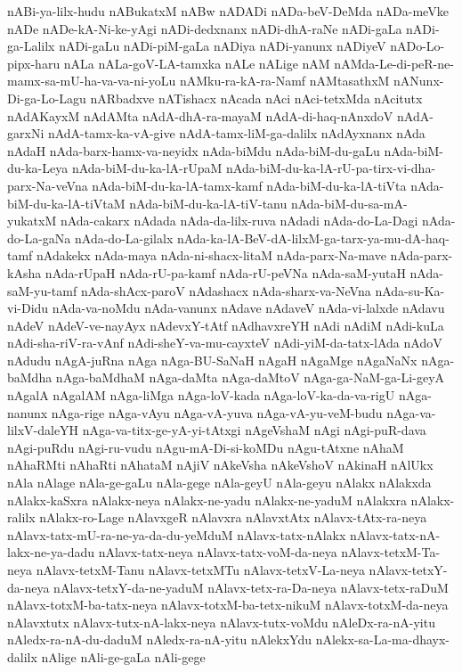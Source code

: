 {nABi-ya-lilx-hudu
nABukatxM
nABw
nADADi
nADa-beV-DeMda
nADa-meVke
nADe
nADe-kA-Ni-ke-yAgi
nADi-dedxnanx
nADi-dhA-raNe
nADi-gaLa
nADi-ga-Lalilx
nADi-gaLu
nADi-piM-gaLa
nADiya
nADi-yanunx
nADiyeV
nADo-Lo-pipx-haru
nALa
nALa-goV-LA-tamxka
nALe
nALige
nAM
nAMda-Le-di-peR-ne-mamx-sa-mU-ha-va-va-ni-yoLu
nAMku-ra-kA-ra-Namf
nAMtasathxM
nANunx-Di-ga-Lo-Lagu
nARbadxve
nATishacx
nAcada
nAci
nAci-tetxMda
nAcitutx
nAdAKayxM
nAdAMta
nAdA-dhA-ra-mayaM
nAdA-di-haq-nAnxdoV
nAdA-garxNi
nAdA-tamx-ka-vA-give
nAdA-tamx-liM-ga-dalilx
nAdAyxnanx
nAda
nAdaH
nAda-barx-hamx-va-neyidx
nAda-biMdu
nAda-biM-du-gaLu
nAda-biM-du-ka-Leya
nAda-biM-du-ka-lA-rUpaM
nAda-biM-du-ka-lA-rU-pa-tirx-vi-dha-parx-Na-veVna
nAda-biM-du-ka-lA-tamx-kamf
nAda-biM-du-ka-lA-tiVta
nAda-biM-du-ka-lA-tiVtaM
nAda-biM-du-ka-lA-tiV-tanu
nAda-biM-du-sa-mA-yukatxM
nAda-cakarx
nAdada
nAda-da-lilx-ruva
nAdadi
nAda-do-La-Dagi
nAda-do-La-gaNa
nAda-do-La-gilalx
nAda-ka-lA-BeV-dA-lilxM-ga-tarx-ya-mu-dA-haq-tamf
nAdakekx
nAda-maya
nAda-ni-shacx-litaM
nAda-parx-Na-mave
nAda-parx-kAsha
nAda-rUpaH
nAda-rU-pa-kamf
nAda-rU-peVNa
nAda-saM-yutaH
nAda-saM-yu-tamf
nAda-shAcx-paroV
nAdashacx
nAda-sharx-va-NeVna
nAda-su-Ka-vi-Didu
nAda-va-noMdu
nAda-vanunx
nAdave
nAdaveV
nAda-vi-lalxde
nAdavu
nAdeV
nAdeV-ve-nayAyx
nAdevxY-tAtf
nAdhavxreYH
nAdi
nAdiM
nAdi-kuLa
nAdi-sha-riV-ra-vAnf
nAdi-sheY-va-mu-cayxteV
nAdi-yiM-da-tatx-lAda
nAdoV
nAdudu
nAgA-juRna
nAga
nAga-BU-SaNaH
nAgaH
nAgaMge
nAgaNaNx
nAga-baMdha
nAga-baMdhaM
nAga-daMta
nAga-daMtoV
nAga-ga-NaM-ga-Li-geyA
nAgalA
nAgalAM
nAga-liMga
nAga-loV-kada
nAga-loV-ka-da-va-rigU
nAga-nanunx
nAga-rige
nAga-vAyu
nAga-vA-yuva
nAga-vA-yu-veM-budu
nAga-va-lilxV-daleYH
nAga-va-titx-ge-yA-yi-tAtxgi
nAgeVshaM
nAgi
nAgi-puR-dava
nAgi-puRdu
nAgi-ru-vudu
nAgu-mA-Di-si-koMDu
nAgu-tAtxne
nAhaM
nAhaRMti
nAhaRti
nAhataM
nAjiV
nAkeVsha
nAkeVshoV
nAkinaH
nAlUkx
nAla
nAlage
nAla-ge-gaLu
nAla-gege
nAla-geyU
nAla-geyu
nAlakx
nAlakxda
nAlakx-kaSxra
nAlakx-neya
nAlakx-ne-yadu
nAlakx-ne-yaduM
nAlakxra
nAlakx-ralilx
nAlakx-ro-Lage
nAlavxgeR
nAlavxra
nAlavxtAtx
nAlavx-tAtx-ra-neya
nAlavx-tatx-mU-ra-ne-ya-da-du-yeMduM
nAlavx-tatx-nAlakx
nAlavx-tatx-nA-lakx-ne-ya-dadu
nAlavx-tatx-neya
nAlavx-tatx-voM-da-neya
nAlavx-tetxM-Ta-neya
nAlavx-tetxM-Tanu
nAlavx-tetxMTu
nAlavx-tetxV-La-neya
nAlavx-tetxY-da-neya
nAlavx-tetxY-da-ne-yaduM
nAlavx-tetx-ra-Da-neya
nAlavx-tetx-raDuM
nAlavx-totxM-ba-tatx-neya
nAlavx-totxM-ba-tetx-nikuM
nAlavx-totxM-da-neya
nAlavxtutx
nAlavx-tutx-nA-lakx-neya
nAlavx-tutx-voMdu
nAleDx-ra-nA-yitu
nAledx-ra-nA-du-daduM
nAledx-ra-nA-yitu
nAlekxYdu
nAlekx-sa-La-ma-dhayx-dalilx
nAlige
nAli-ge-gaLa
nAli-gege
}
